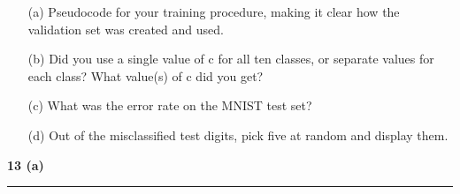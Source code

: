 \documentclass{article}
\begin{document}
\begin{itemize}
    \begin{enumerate}
        \item[(a)] Pseudocode for your training procedure, making it clear how the validation set was created and used.
        \item[(b)] Did you use a single value of c for all ten classes, or separate values for each class?
        What value(s) of c did you get?
        \item[(c)] What was the error rate on the MNIST test set?
        \item[(d)] Out of the misclassified test digits, pick five at random and display them.
    \end{enumerate}
\end{itemize}

\newpage

\parbox{\textwidth}{\textbf{13 (a)}}

\noindent\rule{\textwidth}{0.4pt}\\
\end{document}
